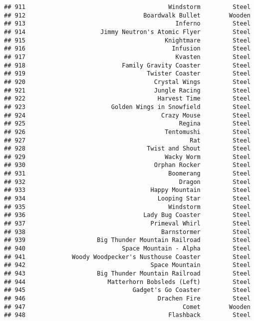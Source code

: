 \documentclass[
]{article}
\begin{document}
\begin{verbatim}
## 911                                        Windstorm         Steel
## 912                                 Boardwalk Bullet        Wooden
## 913                                          Inferno         Steel
## 914                     Jimmy Neutron's Atomic Flyer         Steel
## 915                                       Knightmare         Steel
## 916                                         Infusion         Steel
## 917                                          Kvasten         Steel
## 918                           Family Gravity Coaster         Steel
## 919                                  Twister Coaster         Steel
## 920                                    Crystal Wings         Steel
## 921                                    Jungle Racing         Steel
## 922                                     Harvest Time         Steel
## 923                        Golden Wings in Snowfield         Steel
## 924                                      Crazy Mouse         Steel
## 925                                           Regina         Steel
## 926                                       Tentomushi         Steel
## 927                                              Rat         Steel
## 928                                  Twist and Shout         Steel
## 929                                       Wacky Worm         Steel
## 930                                    Orphan Rocker         Steel
## 931                                        Boomerang         Steel
## 932                                           Dragon         Steel
## 933                                   Happy Mountain         Steel
## 934                                     Looping Star         Steel
## 935                                        Windstorm         Steel
## 936                                 Lady Bug Coaster         Steel
## 937                                   Primeval Whirl         Steel
## 938                                      Barnstormer         Steel
## 939                    Big Thunder Mountain Railroad         Steel
## 940                           Space Mountain - Alpha         Steel
## 941             Woody Woodpecker's Nusthouse Coaster         Steel
## 942                                   Space Mountain         Steel
## 943                    Big Thunder Mountain Railroad         Steel
## 944                       Matterhorn Bobsleds (Left)         Steel
## 945                              Gadget's Go Coaster         Steel
## 946                                     Drachen Fire         Steel
## 947                                            Comet        Wooden
## 948                                        Flashback         Steel

\end{verbatim}
\end{document}
